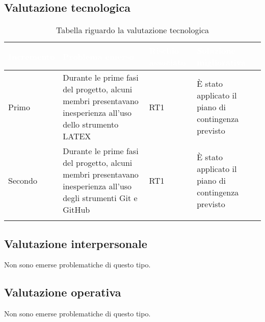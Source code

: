 \subsection{Valutazione tecnologica}
{
    \setlength{\freewidth}{\dimexpr\textwidth-10\tabcolsep}
    \renewcommand{\arraystretch}{1.5}
    \centering
    \setlength{\aboverulesep}{0pt}
    \setlength{\belowrulesep}{0pt}
    \begin{longtable}{C{.25\freewidth} C{.257\freewidth} C{.16\freewidth} C{.4\freewidth}}
       \toprule
    \textcolor{white}{\textbf{Incremento}}&
    \textcolor{white}{\textbf{Problema emerso}}&
    \textcolor{white}{\textbf{Rischio associato}}&
    \textcolor{white}{\textbf{Soluzione migliorativa}}\\	
    \toprule
    \endhead
    
Primo & Durante le prime fasi del progetto, alcuni membri presentavano inesperienza all'uso dello strumento LATEX & RT1 & È stato applicato il piano di contingenza
previsto \\
Secondo & Durante le prime fasi del progetto, alcuni membri presentavano inesperienza all'uso degli strumenti Git e GitHub & RT1 & È stato applicato il piano di contingenza
previsto\\

 \bottomrule
 \caption{Tabella riguardo la valutazione tecnologica}
\end{longtable}
}

\subsection{Valutazione interpersonale}
Non sono emerse problematiche di questo tipo. 

\subsection{Valutazione operativa}
Non sono emerse problematiche di questo tipo.
